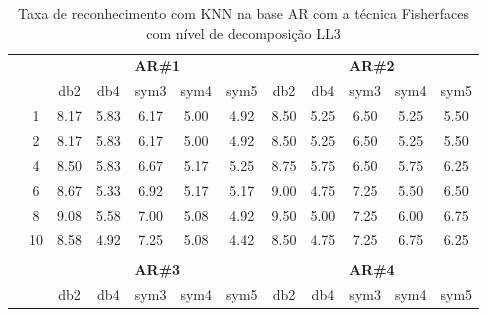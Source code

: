 \begin{table}[H]
	\centering
    \normalsize
	\caption{Taxa de reconhecimento com KNN na base AR com a técnica Fisherfaces com nível de decomposição LL3}
	\begin{tabular}{|c|c|c c c c c|c c c c c|}
\cline{3-12}
\multicolumn{2}{c|}{\multirow{2}{*}{}} & \multicolumn{5}{c|}{\textbf{AR\#1}}  & \multicolumn{5}{c|}{\textbf{AR\#2}} \\\cline{3-12}

\multicolumn{2}{c|}{}  & db2 & db4 & sym3 & sym4 & sym5 & db2 & db4& sym3 & sym4 & sym5 \\\hline

\multicolumn{1}{|c|}{ \multirow{5}{*}{\rotatebox[origin=c]{90}{\textbf{K-vizinhos}}} }
&1	&8.17	&5.83	&6.17	&5.00	&4.92	&8.50	&5.25	&6.50	&5.25&	5.50\\\cline{2-12}
&2	&8.17	&5.83	&6.17	&5.00	&4.92	&8.50	&5.25	&6.50	&5.25&	5.50\\\cline{2-12}
&4	&8.50	&5.83	&6.67	&5.17	&5.25	&8.75	&5.75	&6.50	&5.75&	6.25\\\cline{2-12}
&6	&8.67	&5.33	&6.92	&5.17	&5.17	&9.00	&4.75	&7.25	&5.50&	6.50\\\cline{2-12}
&8	&9.08	&5.58	&7.00	&5.08	&4.92	&9.50	&5.00	&7.25	&6.00&	6.75\\\cline{2-12}
&10	&8.58	&4.92	&7.25	&5.08	&4.42	&8.50	&4.75	&7.25	&6.75&	6.25\\ \midrule
\multicolumn{12}{c}{}\\ 




\cline{3-12}
\multicolumn{2}{c}{} & \multicolumn{5}{|c|}{\textbf{AR\#3}}  & \multicolumn{5}{c|}{\textbf{AR\#4}} \\\cline{3-12}
\multicolumn{2}{c}{}  & \multicolumn{1}{|c}{db2} & db4 & sym3 & sym4 & sym5 & db2 & db4& sym3 & sym4 & sym5 \\\hline


\end{tabular}
\end{table}

